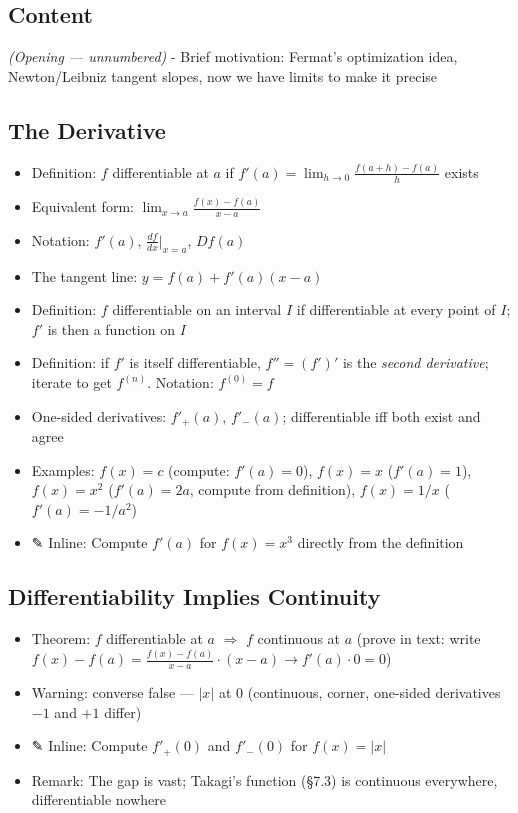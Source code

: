 \documentclass[
  10pt,
  letterpaper,
]{scrbook}
\providecommand{\tightlist}{%
  \setlength{\itemsep}{0pt}\setlength{\parskip}{0pt}}
\begin{document}
\subsection{Content}\label{content-29}

\emph{(Opening --- unnumbered)} - Brief motivation: Fermat's
optimization idea, Newton/Leibniz tangent slopes, now we have limits to
make it precise

\subsection{The Derivative}\label{the-derivative}

\begin{itemize}
\tightlist
\item
  Definition: \(f\) differentiable at \(a\) if
  \(f'(a) = \lim_{h \to 0} \frac{f(a+h) - f(a)}{h}\) exists
\item
  Equivalent form: \(\lim_{x \to a} \frac{f(x) - f(a)}{x - a}\)
\item
  Notation: \(f'(a)\), \(\frac{df}{dx}\big|_{x=a}\), \(Df(a)\)
\item
  The tangent line: \(y = f(a) + f'(a)(x - a)\)
\item
  Definition: \(f\) differentiable on an interval \(I\) if
  differentiable at every point of \(I\); \(f'\) is then a function on
  \(I\)
\item
  Definition: if \(f'\) is itself differentiable, \(f'' = (f')'\) is the
  \emph{second derivative}; iterate to get \(f^{(n)}\). Notation:
  \(f^{(0)} = f\)
\item
  One-sided derivatives: \(f'_+(a)\), \(f'_-(a)\); differentiable iff
  both exist and agree
\item
  Examples: \(f(x) = c\) (compute: \(f'(a) = 0\)), \(f(x) = x\)
  (\(f'(a) = 1\)), \(f(x) = x^2\) (\(f'(a) = 2a\), compute from
  definition), \(f(x) = 1/x\) (\(f'(a) = -1/a^2\))
\item
  ✎ Inline: Compute \(f'(a)\) for \(f(x) = x^3\) directly from the
  definition
\end{itemize}

\subsection{Differentiability Implies
Continuity}\label{differentiability-implies-continuity}

\begin{itemize}
\tightlist
\item
  Theorem: \(f\) differentiable at \(a\) \(\Longrightarrow\) \(f\)
  continuous at \(a\) (prove in text: write
  \(f(x) - f(a) = \frac{f(x)-f(a)}{x-a} \cdot (x-a) \to f'(a) \cdot 0 = 0\))
\item
  Warning: converse false --- \(|x|\) at \(0\) (continuous, corner,
  one-sided derivatives \(-1\) and \(+1\) differ)
\item
  ✎ Inline: Compute \(f'_+(0)\) and \(f'_-(0)\) for \(f(x) = |x|\)
\item
  Remark: The gap is vast; Takagi's function (§7.3) is continuous
  everywhere, differentiable nowhere
\end{itemize}
\end{document}
